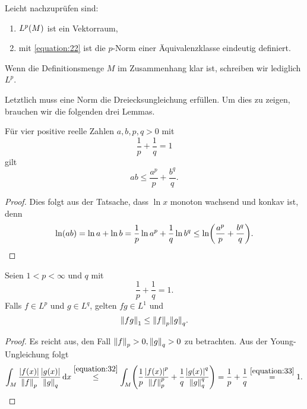 Leicht nachzuprüfen sind:
\begin{enumerate}
	\item \(L^p\parentheses*{M}\) ist ein Vektorraum,
	\item mit \eqref{equation:22} ist die \(p\)-Norm einer Äquivalenzklasse eindeutig definiert.
\end{enumerate}
Wenn die Definitionsmenge \(M\) im Zusammenhang klar ist, schreiben wir lediglich \(L^p\).

Letztlich muss eine Norm die Dreiecksungleichung erfüllen.
Um dies zu zeigen, brauchen wir die folgenden drei Lemmas.

\begin{lemma}
	Für vier positive reelle Zahlen \(a, b, p, q > 0\) mit
	\[
		\frac{1}{p} + \frac{1}{q} = 1
	\]
	gilt
	\begin{equation}\label{equation:32}
		ab \le \frac{a^p}{p} + \frac{b^q}{q}.
	\end{equation}
\end{lemma}

\begin{proof}
	Dies folgt aus der Tatsache, dass \(\ln x\) monoton wachsend und konkav ist, denn
	\[
		\ln\parentheses*{ab} = \ln a + \ln b = \frac{1}{p}\ln a^p + \frac{1}{q}\ln b^q \le \ln\parentheses*{\frac{a^p}{p} + \frac{b^q}{q}}.
	\]
\end{proof}

\begin{lemma}
	Seien \(1 < p < \infty\) und \(q\) mit
	\begin{equation}\label{equation:33}
		\frac{1}{p} + \frac{1}{q} = 1.
	\end{equation}
	Falls \(f \in L^p\) und \(g \in L^q\), gelten \(fg \in L^1\) und
	\begin{equation}\label{equation:34}
		\norm*{fg}_1 \le \norm*{f}_p \norm*{g}_q.
	\end{equation}
\end{lemma}

\begin{proof}
	Es reicht aus, den Fall \(\norm*{f}_p > 0, \norm*{g}_q > 0\) zu betrachten.
	Aus der Young-Ungleichung folgt
	\[
		\int_M \frac{\absolute*{f\parentheses*{x}}}{\norm*{f}_p}\frac{\absolute*{g\parentheses*{x}}}{\norm*{g}_q}\d x \stackrel{\eqref{equation:32}}{\le} \int_M \parentheses*{\frac{1}{p}\frac{\absolute*{f\parentheses*{x}}^p}{\norm*{f}_p^p} + \frac{1}{q}\frac{\absolute*{g\parentheses*{x}}^q}{\norm*{g}_q^q}} = \frac{1}{p} + \frac{1}{q} \stackrel{\eqref{equation:33}}{=} 1.
	\]
\end{proof}

